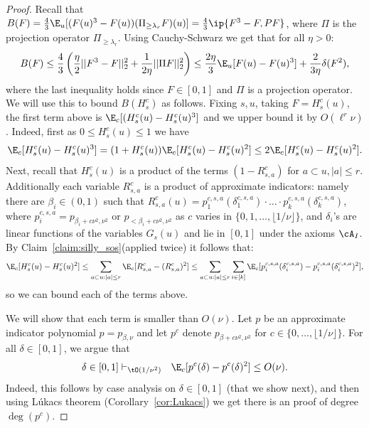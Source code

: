 \begin{proof}
Recall that $B(F) = \frac{4}{3}\E_u[(F(u)^3 - F(u))(\Pi_{\geq \lambda_r}F)(u)] = \frac{4}{3}\ip{F^3 - F, PF}$, where $\Pi$ is the projection operator $\Pi_{\geq \lambda_r}$. Using Cauchy-Schwarz we get that for all $\eta > 0$:
\begin{equation}\label{eq:bool-cs}
B(F) \leq \frac{4}{3}\left(\frac{\eta}{2}||F^3 - F||_2^2 + \frac{1}{2\eta}||\Pi F||_2^2\right) \leq \frac{2\eta}{3}\E_u[F(u) -F(u)^3] + \frac{2}{3\eta}\delta(F^2),
\end{equation}
where the last inequality holds since $F \in [0,1]$ and $\Pi$ is a projection operator. We will use this 
to bound $B(H_s^c)$ as follows. 
Fixing $s, u$, taking $F = H_s^c(u)$, 
the first term above is 
$\E_c[(H_s^c(u)-H_s^c(u)^3]$ and we upper bound it 
by $O(\ell^r\nu)$. Indeed, first as 
$0\leq H_s^c(u)\leq 1$ we have
\begin{equation}\label{eq:bool1}
\E_c[H_s^c(u) - H_s^c(u)^3] = (1+H_s^c(u))\E_c[H_s^c(u) - H_s^c(u)^2] \leq 2 \E_c[H_s^c(u) - H_s^c(u)^2].    
\end{equation}
Next, recall that $H_s^c(u)$ is a product of the terms $(1-R^c_{s,a})$ for $a \subset u, |a| \leq r$. Additionally each variable $R^c_{s,a}$ is a product of approximate indicators: namely there are $\beta_i \in (0,1)$  such that $R_{s,a}^c(u) = p^{c,s,a}_1(\delta^{c,s,a}_1)\cdot \ldots\cdot p^{c,s,a}_k(\delta^{c,s,a}_k)$, where $p^{c,s,a}_i = p_{\beta_i+c\nu^2,\nu^2}$ or $p_{<\beta_i+c\nu^2,\nu^2}$ as $c$ varies in $\{0,1,\ldots,\lfloor 1/\nu \rfloor\}$, and $\delta_i$'s are linear functions of the variables $G_s(u)$ and lie in $[0,1]$ under the axioms $\cA_I$.
By Claim~\ref{claim:silly_sos}(applied twice) it follows that:
\[\E_c[H_s^c(u) - H_s^c(u)^2] \leq \sum_{a \subset u: |a|\leq r}\E_c[R^c_{s,a} - (R^c_{s,a})^2] \leq \sum_{a \subset u: |a|\leq r}\sum_{i \in [k]}\E_c[p_i^{c,s,a}(\delta^{c,s,a}_i) - p_i^{c,s,a}(\delta^{c,s,a}_i)^2],\]
so we can bound each of the terms above.  

We will show that each term is smaller than $O(\nu)$. Let $p$ be an approximate indicator polynomial $p = p_{\beta,\nu}$ and let $p^c$ denote $p_{\beta+c\nu^2,\nu^2}$ for $c \in \{0,\ldots,\lfloor 1/\nu\rfloor\}$. For all $\delta \in [0,1]$, we argue that
\begin{equation}\label{eq:bool-random}
\delta \in [0,1] \vdash_{\tO(1/\nu^2)} ~~ \E_c[p^c(\delta) - p^c(\delta)^2] \leq O(\nu).
\end{equation}
Indeed, this follows by case analysis on $\delta \in [0,1]$ (that we show next), and then using L\'{u}kacs theorem (Corollary~\ref{cor:Lukacs}) we get there is an \sos proof of degree $\deg(p^c)$. 


\end{proof}
